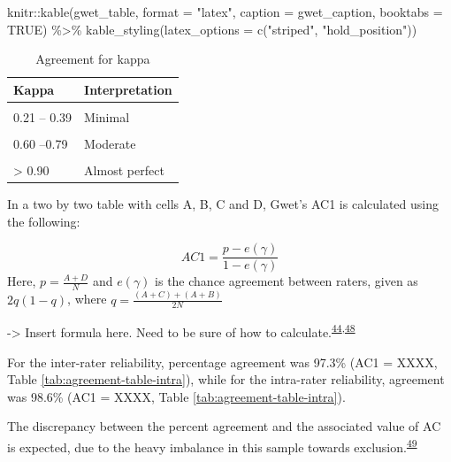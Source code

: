 \documentclass[a4paper, twoside]{templates/ociamthesis}
\newenvironment{Shaded}{\begin{snugshade}}{\end{snugshade}}
\newcommand{\AttributeTok}[1]{\textcolor[rgb]{0.77,0.63,0.00}{#1}}
\newcommand{\ConstantTok}[1]{\textcolor[rgb]{0.00,0.00,0.00}{#1}}
\newcommand{\FunctionTok}[1]{\textcolor[rgb]{0.00,0.00,0.00}{#1}}
\newcommand{\NormalTok}[1]{#1}
\newcommand{\SpecialCharTok}[1]{\textcolor[rgb]{0.00,0.00,0.00}{#1}}
\newcommand{\StringTok}[1]{\textcolor[rgb]{0.31,0.60,0.02}{#1}}
\renewenvironment{Shaded}
{
  \vspace{4pt}%
  \begin{snugshade}%
}{%
  \end{snugshade}%
  \vspace{4pt}%
}
\begin{document}
\begin{Shaded}
\begin{Highlighting}[]
\NormalTok{knitr}\SpecialCharTok{::}\FunctionTok{kable}\NormalTok{(gwet\_table, }\AttributeTok{format =} \StringTok{"latex"}\NormalTok{, }\AttributeTok{caption =}\NormalTok{ gwet\_caption, }\AttributeTok{booktabs =} \ConstantTok{TRUE}\NormalTok{) }\SpecialCharTok{\%\textgreater{}\%} 
  \FunctionTok{kable\_styling}\NormalTok{(}\AttributeTok{latex\_options =} \FunctionTok{c}\NormalTok{(}\StringTok{"striped"}\NormalTok{, }\StringTok{"hold\_position"}\NormalTok{))}
\end{Highlighting}
\end{Shaded}

\begin{table}[!h]

\caption{\label{tab:gwet-table}Agreement for kappa}
\centering
\begin{tabular}[t]{ll}
\toprule
Kappa & Interpretation\\
\midrule
\cellcolor{gray!6}{0 – 0.20} & \cellcolor{gray!6}{None}\\
0.21 – 0.39 & Minimal\\
\cellcolor{gray!6}{0.40 –.59} & \cellcolor{gray!6}{Weak}\\
0.60 –0.79 & Moderate\\
\cellcolor{gray!6}{0.80–0.90} & \cellcolor{gray!6}{Strong}\\
\addlinespace
> 0.90 & Almost perfect\\
\bottomrule
\end{tabular}
\end{table}

In a two by two table with cells A, B, C and D, Gwet's AC1 is calculated using the following:

\[AC1 = \frac{p-e(\gamma)}{1-e(\gamma)}\] Here, \(p = \frac{A+D}{N}\) and \(e(\gamma)\) is the chance agreement between raters, given as \(2q(1-q)\), where \(q = \frac{(A+C)+(A+B)}{2N}\)

-\textgreater{} Insert formula here. Need to be sure of how to calculate.\textsuperscript{\protect\hyperlink{ref-gwet2008}{44},\protect\hyperlink{ref-sim2005}{48}}

For the inter-rater reliability, percentage agreement was 97.3\% (AC1 = XXXX, Table \ref{tab:agreement-table-intra}), while for the intra-rater reliability, agreement was 98.6\% (AC1 = XXXX, Table \ref{tab:agreement-table-intra}).

The discrepancy between the percent agreement and the associated value of AC is expected, due to the heavy imbalance in this sample towards exclusion.\textsuperscript{\protect\hyperlink{ref-feinstein1990}{49}}
\end{document}
